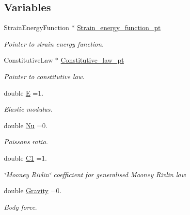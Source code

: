 \subsection*{Variables}
\begin{DoxyCompactItemize}
\item 
Strain\+Energy\+Function $\ast$ \hyperlink{namespaceGlobal__Physical__Variables_a73135f793690b4386bf83bbefc7bf310}{Strain\+\_\+energy\+\_\+function\+\_\+pt}
\begin{DoxyCompactList}\small\item\em Pointer to strain energy function. \end{DoxyCompactList}\item 
Constitutive\+Law $\ast$ \hyperlink{namespaceGlobal__Physical__Variables_a2a37fb040c832ee7a086bb13bb02a100}{Constitutive\+\_\+law\+\_\+pt}
\begin{DoxyCompactList}\small\item\em Pointer to constitutive law. \end{DoxyCompactList}\item 
double \hyperlink{namespaceGlobal__Physical__Variables_a09a019474b7405b35da2437f7779bc7e}{E} =1.
\begin{DoxyCompactList}\small\item\em Elastic modulus. \end{DoxyCompactList}\item 
double \hyperlink{namespaceGlobal__Physical__Variables_a3962c36313826b19f216f6bbbdd6a477}{Nu} =0.
\begin{DoxyCompactList}\small\item\em Poisson\textquotesingle{}s ratio. \end{DoxyCompactList}\item 
double \hyperlink{namespaceGlobal__Physical__Variables_a849754fa7155c1a31481674ce4845658}{C1} =1.
\begin{DoxyCompactList}\small\item\em \char`\"{}\+Mooney Rivlin\char`\"{} coefficient for generalised Mooney Rivlin law \end{DoxyCompactList}\item 
double \hyperlink{namespaceGlobal__Physical__Variables_a8b80d3e8d63b8d0a0ed435a2dd7fe2ad}{Gravity} =0.
\begin{DoxyCompactList}\small\item\em Body force. \end{DoxyCompactList}\end{DoxyCompactItemize}


